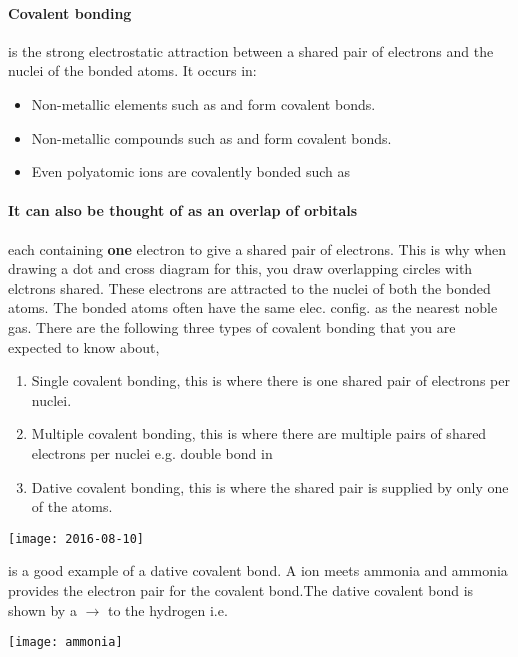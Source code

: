     \paragraph{Covalent bonding} is the strong electrostatic attraction between a shared pair of electrons and the nuclei of the bonded atoms. It occurs in:
    \begin{itemize}
	 	\item Non-metallic elements such as  and  form covalent bonds.
	 	\item Non-metallic compounds such as  and  form covalent bonds.
	 	\item Even polyatomic ions are covalently bonded such as 
	\end{itemize}
    \paragraph{It can also be thought of as an overlap of orbitals} each containing \textbf{one} electron to give a shared pair of electrons. 
    This is why when drawing a dot and cross diagram for this, you draw overlapping circles with elctrons shared.
    These electrons are attracted to the nuclei of both the bonded atoms.
    The bonded atoms often have the same elec. config. as the nearest noble gas.
    There are the following three types of covalent bonding that you are expected to know about,
	\begin{enumerate}
		\item Single covalent bonding, this is where there is one shared pair of electrons per nuclei.
		\item Multiple covalent bonding, this is where there are multiple pairs of shared electrons per nuclei e.g. double bond in  
		\item Dative covalent bonding, this is where the shared pair is supplied by only one of the atoms.
	\end{enumerate}
   \begin{center}
   \texttt{[image: 2016-08-10]}
\end{center}
    is a good example of a dative covalent bond. A  ion meets ammonia and ammonia provides the electron pair for the covalent bond.The dative covalent bond is shown by a $\rightarrow$ to the hydrogen i.e.
   \newline
    \begin{center}
\texttt{[image: ammonia]}
\end{center}
	
